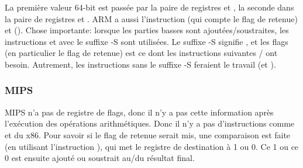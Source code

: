 La première valeur 64-bit est passée par la paire de registres  et ,
la seconde dans la paire de registres  et .
ARM a aussi l'instruction  (qui compte le flag de retenue) et 
().
Chose importante: lorsque les parties basses sont ajoutées/soustraites, les instructions
 et  avec le suffixe -S sont utilisées.
Le suffixe -S signifie , et les flags (en particulier le flag
de retenue) est ce dont les instructions suivantes / ont besoin.
Autrement, les instructions sans le suffixe -S feraient le travail (\ADD et \SUB).

\subsubsection{MIPS}



MIPS n'a pas de registre de flags, donc il n'y a pas cette information après l'exécution
des opérations arithmétiques.
Donc il n'y a pas d'instructions comme  et  du x86.
Pour savoir si le flag de retenue serait mis, une comparaison est faite (en utilisant
l'instruction ), qui met le registre de destination à 1 ou 0.
Ce 1 ou ce 0 est ensuite ajouté ou soustrait au/du résultat final.

